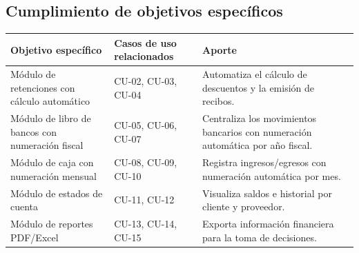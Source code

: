 \documentclass[stu]{apa7}
\begin{document}
\subsection{Cumplimiento de objetivos específicos}

\begin{longtable}{|L{3cm}|L{5cm}|L{6cm}|}
\hline
{}
\textbf{Objetivo específico} & \textbf{Casos de uso relacionados} & \textbf{Aporte} \\
\hline
Módulo de retenciones con cálculo automático & CU-02, CU-03, CU-04 & Automatiza el cálculo de descuentos y la emisión de recibos. \\
\hline
Módulo de libro de bancos con numeración fiscal & CU-05, CU-06, CU-07 & Centraliza los movimientos bancarios con numeración automática por año fiscal. \\
\hline
Módulo de caja con numeración mensual & CU-08, CU-09, CU-10 & Registra ingresos/egresos con numeración automática por mes. \\
\hline
Módulo de estados de cuenta & CU-11, CU-12 & Visualiza saldos e historial por cliente y proveedor. \\
\hline
Módulo de reportes PDF/Excel & CU-13, CU-14, CU-15 & Exporta información financiera para la toma de decisiones. \\
\hline
\end{longtable}
\end{document}
